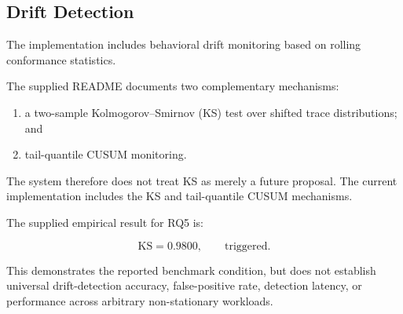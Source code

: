\documentclass[11pt,a4paper]{article}
\begin{document}
\subsection{Drift Detection}

The implementation includes behavioral drift monitoring based on rolling conformance
statistics.

The supplied README documents two complementary mechanisms:

\begin{enumerate}
\item a two-sample Kolmogorov--Smirnov (KS) test over shifted trace distributions; and
\item tail-quantile CUSUM monitoring.
\end{enumerate}

The system therefore does not treat KS as merely a future proposal. The current
implementation includes the KS and tail-quantile CUSUM mechanisms.

The supplied empirical result for RQ5 is:

\[
\mathrm{KS}=0.9800,\qquad \text{triggered}.
\]

This demonstrates the reported benchmark condition, but does not establish
universal drift-\allowbreak detection accuracy, false-\allowbreak positive rate,
detection latency, or performance across arbitrary non-\allowbreak stationary workloads.
\end{document}
